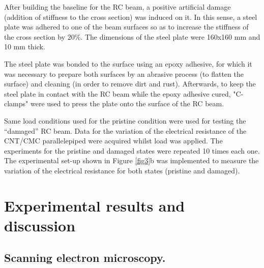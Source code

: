\documentclass[twocolumn]{bmcart}%
\begin{document}
\begin{figure}[h!]
  \caption{
      }
      \label{fig6}
      \end{figure}

After building the baseline for the RC beam, a positive artificial damage (addition of stiffness to the cross section) was induced on it. In this sense, a steel plate was adhered to one of the beam surfaces so as to increase the stiffness of the cross section by $20\%$. The dimensions of the steel plate were 160x160 mm and 10 mm thick. 

The steel plate was bonded to the surface using an epoxy adhesive, for which it was necessary to prepare both surfaces by an abrasive process (to flatten the surface) and cleaning (in order to remove dirt and rust). Afterwards, to keep the steel plate in contact with the RC beam while the epoxy adhesive cured, "C-clamps" were used to press the plate onto the surface of the RC beam.

Same load conditions used for the pristine condition were used for testing the “damaged” RC beam. Data for the variation of the electrical resistance of the CNT/CMC parallelepiped were acquired whilst load was applied. The experiments for the pristine and damaged states were repeated 10 times each one. The experimental set-up shown in Figure \ref{fig3}b was implemented to measure the variation of the electrical resistance for both states (pristine and damaged).

\section{Experimental results and discussion}

\subsection{Scanning electron microscopy.}
\end{document}
